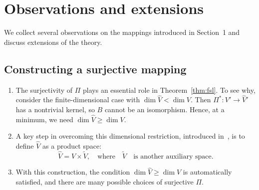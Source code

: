 \documentclass[11pt]{article}
\theoremstyle{remark}
\begin{document}
\appendix
\section{Observations and extensions}
We collect several observations on the mappings introduced in Section~1 and discuss extensions of the theory.
\subsection{Constructing a surjective mapping}
\begin{enumerate}[{\bf {\thesubsection}.1.}]
\item The surjectivity of $\Pi$ plays an essential role in Theorem~\ref{thm:fsl}. To see why, consider the finite-dimensional case with $\dim \widehat{V} < \dim V$. Then $\Pi^*: V' \to \widehat{V}'$ has a nontrivial kernel, so $B$ cannot be an isomorphism. Hence, at a minimum, we need $\dim \widehat{V} \ge \dim V$.
\item A key step in overcoming this dimensional restriction, introduced in~\cite{Xu1996}, is to define $\widehat{V}$ as a product space:
\begin{equation}
  \widehat{V} = V \times \widetilde{V},
\quad\mbox{where}\quad\widetilde{V}\quad \mbox{is another auxiliary space.} 
\end{equation} 
\item With this construction, the condition $\dim \widehat{V} \ge \dim V$ is automatically satisfied, and there are many possible choices of surjective $\Pi$.
\end{enumerate}
\end{document}
